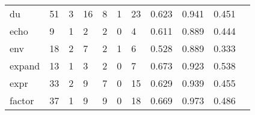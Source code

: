 \begin{longtable}{lp{1.2cm}p{1.2cm}p{1.2cm}p{1.2cm}p{1.2cm}p{1.2cm}p{1.2cm}p{1.2cm}p{1.2cm}p{1.2cm}}
du        &                                    51 &                                                  3 &                                                 16 &                                                  8 &                                                  1 &                                                 23 &                                              0.623 &                                              0.941 &                                              0.451 \\
echo      &                                     9 &                                                  1 &                                                  2 &                                                  2 &                                                  0 &                                                  4 &                                              0.611 &                                              0.889 &                                              0.444 \\
env       &                                    18 &                                                  2 &                                                  7 &                                                  2 &                                                  1 &                                                  6 &                                              0.528 &                                              0.889 &                                              0.333 \\
expand    &                                    13 &                                                  1 &                                                  3 &                                                  2 &                                                  0 &                                                  7 &                                              0.673 &                                              0.923 &                                              0.538 \\
expr      &                                    33 &                                                  2 &                                                  9 &                                                  7 &                                                  0 &                                                 15 &                                              0.629 &                                              0.939 &                                              0.455 \\
factor    &                                    37 &                                                  1 &                                                  9 &                                                  9 &                                                  0 &                                                 18 &                                              0.669 &                                              0.973 &                                              0.486 \\

\end{longtable}
